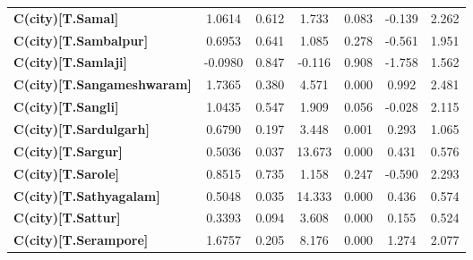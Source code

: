 \begin{center}
\begin{tabular}{lcccccc}
\textbf{C(city)[T.Samal]}                                                                           &       1.0614  &        0.612     &     1.733  &         0.083        &       -0.139    &        2.262     \\
\textbf{C(city)[T.Sambalpur]}                                                                       &       0.6953  &        0.641     &     1.085  &         0.278        &       -0.561    &        1.951     \\
\textbf{C(city)[T.Samlaji]}                                                                         &      -0.0980  &        0.847     &    -0.116  &         0.908        &       -1.758    &        1.562     \\
\textbf{C(city)[T.Sangameshwaram]}                                                                  &       1.7365  &        0.380     &     4.571  &         0.000        &        0.992    &        2.481     \\
\textbf{C(city)[T.Sangli]}                                                                          &       1.0435  &        0.547     &     1.909  &         0.056        &       -0.028    &        2.115     \\
\textbf{C(city)[T.Sardulgarh]}                                                                      &       0.6790  &        0.197     &     3.448  &         0.001        &        0.293    &        1.065     \\
\textbf{C(city)[T.Sargur]}                                                                          &       0.5036  &        0.037     &    13.673  &         0.000        &        0.431    &        0.576     \\
\textbf{C(city)[T.Sarole]}                                                                          &       0.8515  &        0.735     &     1.158  &         0.247        &       -0.590    &        2.293     \\
\textbf{C(city)[T.Sathyagalam]}                                                                     &       0.5048  &        0.035     &    14.333  &         0.000        &        0.436    &        0.574     \\
\textbf{C(city)[T.Sattur]}                                                                          &       0.3393  &        0.094     &     3.608  &         0.000        &        0.155    &        0.524     \\
\textbf{C(city)[T.Serampore]}                                                                       &       1.6757  &        0.205     &     8.176  &         0.000        &        1.274    &        2.077     \\

\end{tabular}
\end{center}
